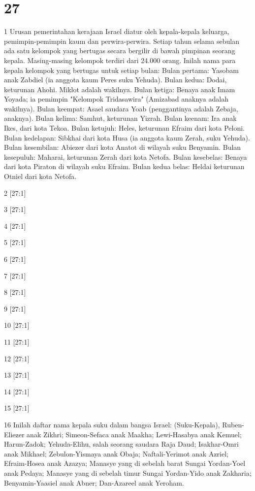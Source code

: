 \chapter{27}

\par 1 Urusan pemerintahan kerajaan Israel diatur oleh kepala-kepala keluarga, pemimpin-pemimpin kaum dan perwira-perwira. Setiap tahun selama sebulan ada satu kelompok yang bertugas secara bergilir di bawah pimpinan seorang kepala. Masing-masing kelompok terdiri dari 24.000 orang. Inilah nama para kepala kelompok yang bertugas untuk setiap bulan: Bulan pertama: Yasobam anak Zabdiel (ia anggota kaum Peres suku Yehuda). Bulan kedua: Dodai, keturunan Ahohi. Miklot adalah wakilnya. Bulan ketiga: Benaya anak Imam Yoyada; ia pemimpin "Kelompok Tridasawira" (Amizabad anaknya adalah wakilnya). Bulan keempat: Asael saudara Yoab (penggantinya adalah Zebaja, anaknya). Bulan kelima: Samhut, keturunan Yizrah. Bulan keenam: Ira anak Ikes, dari kota Tekoa. Bulan ketujuh: Heles, keturunan Efraim dari kota Peloni. Bulan kedelapan: Sibkhai dari kota Husa (ia anggota kaum Zerah, suku Yehuda). Bulan kesembilan: Abiezer dari kota Anatot di wilayah suku Benyamin. Bulan kesepuluh: Maharai, keturunan Zerah dari kota Netofa. Bulan kesebelas: Benaya dari kota Piraton di wilayah suku Efraim. Bulan kedua belas: Heldai keturunan Otniel dari kota Netofa.
\par 2 [27:1]
\par 3 [27:1]
\par 4 [27:1]
\par 5 [27:1]
\par 6 [27:1]
\par 7 [27:1]
\par 8 [27:1]
\par 9 [27:1]
\par 10 [27:1]
\par 11 [27:1]
\par 12 [27:1]
\par 13 [27:1]
\par 14 [27:1]
\par 15 [27:1]
\par 16 Inilah daftar nama kepala suku dalam bangsa Israel: (Suku-Kepala), Ruben-Eliezer anak Zikhri; Simeon-Sefaca anak Maakha; Lewi-Hasabya anak Kemuel; Harun-Zadok; Yehuda-Elihu, salah seorang saudara Raja Daud; Isakhar-Omri anak Mikhael; Zebulon-Yismaya anak Obaja; Naftali-Yerimot anak Azriel; Efraim-Hosea anak Azazya; Manasye yang di sebelah barat Sungai Yordan-Yoel anak Pedaya; Manasye yang di sebelah timur Sungai Yordan-Yido anak Zakharia; Benyamin-Yaasiel anak Abner; Dan-Azareel anak Yeroham.
